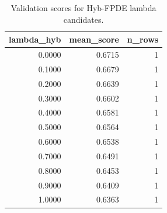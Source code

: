 \begin{table}[t]
\caption{Validation scores for Hyb-FPDE lambda candidates.}
\label{tab:lambda_distribution_computed}
\centering
\begin{tabular}{rrr}
\toprule
lambda\_hyb & mean\_score & n\_rows \\
\midrule
0.0000 & 0.6715 & 1 \\
0.1000 & 0.6679 & 1 \\
0.2000 & 0.6639 & 1 \\
0.3000 & 0.6602 & 1 \\
0.4000 & 0.6581 & 1 \\
0.5000 & 0.6564 & 1 \\
0.6000 & 0.6538 & 1 \\
0.7000 & 0.6491 & 1 \\
0.8000 & 0.6453 & 1 \\
0.9000 & 0.6409 & 1 \\
1.0000 & 0.6363 & 1 \\
\bottomrule
\end{tabular}

\end{table}
